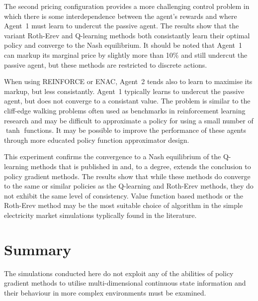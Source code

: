 The second pricing configuration provides a more challenging control problem in
which there is some interdependence between the agent's rewards and where
Agent~1 must learn to undercut the passive agent.  The results show that the
variant Roth-Erev and Q-learning methods both consistantly learn their optimal
policy and converge to the Nash equilibrium.  It should be noted that Agent~1
can markup its marginal price by slightly more than 10\% and still undercut
the passive agent, but these methods are restricted to discrete actions.

When using REINFORCE or ENAC, Agent~2 tends also to learn to maximise its
markup, but less consistantly.  Agent~1 typically learns to undercut the
passive agent, but does not converge to a consistant value.  The problem is
similar to the cliff-edge walking problems often used as benchmarks in
reinforcement learning research and may be difficult to approximate a policy
for using a small number of $\tanh$ functions. It may be possible to improve
the performance of these agents through more educated policy function
approximator design.

This experiment confirms the convergence to a Nash equilibrium of the
Q-learning methods that is published in  and, to a degree,
extends the conclusion to policy gradient methods.  The results show that
while these methods do converge to the same or similar policies as the
Q-learning and Roth-Erev methods, they do not exhibit the same level of
consistency.  Value function based methods or the Roth-Erev method may be the
most suitable choice of algorithm in the simple electricity market simulations
typlically found in the literature.

\section{Summary}
The simulations conducted here do not exploit any of
the abilities of policy gradient methods to utilise multi-dimensional
continuous state information and their behaviour in more complex environments
must be examined.



